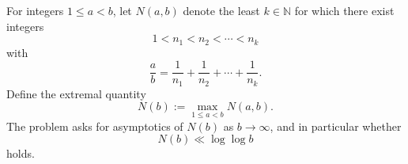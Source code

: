 For integers $1\le a<b$, let $N(a,b)$ denote the least $k\in\mathbb{N}$ for which there exist integers
\[
  1<n_1<n_2<\cdots<n_k
\]
with
\[
  \frac{a}{b} = \frac{1}{n_1}+\frac{1}{n_2}+\cdots+\frac{1}{n_k}.
\]
Define the extremal quantity
\[
  N(b):=\max_{1\le a<b} N(a,b).
\]
The problem asks for asymptotics of $N(b)$ as $b\to\infty$, and in particular whether
\[
  N(b) \ll \log\log b
\]
holds.
